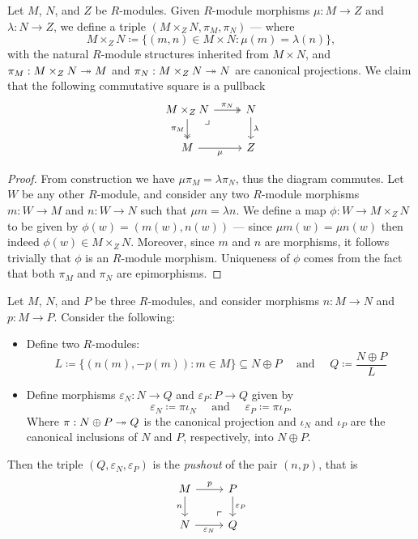 \begin{proposition}[Pullback]
\label{prop:pullback-modules}
Let \(M\), \(N\), and \(Z\) be \(R\)-modules. Given \(R\)-module morphisms
\(\mu: M \to Z\) and \(\lambda: N \to Z\), we define a triple
\((M \times_Z N, \pi_M, \pi_N)\) --- where
\[
M \times_Z N \coloneq \{(m, n) \in M \times N \colon \mu(m) = \lambda(n)\},
\]
with the natural \(R\)-module structures inherited from \(M \times N\), and
\(\pi_M: M \times_Z N \twoheadrightarrow M\) and \(\pi_N: M \times_Z N \twoheadrightarrow N\) are
canonical projections. We claim that the following commutative square is a
pullback
\[
\begin{tikzcd}
M \times_Z N \ar[d, two heads, "\pi_M"'] \ar[r, two heads, "\pi_N"]
\ar[dr, phantom, "\lrcorner", very near start]
&N \ar[d, "\lambda"] \\
M \ar[r, "\mu"'] &Z
\end{tikzcd}
\]
\end{proposition}

\begin{proof}
From construction we have \(\mu \pi_M = \lambda \pi_N\), thus the diagram
commutes. Let \(W\) be any other \(R\)-module, and consider any two \(R\)-module
morphisms \(m: W \to M\) and \(n: W \to N\) such that \(\mu m = \lambda n\). We
define a map \(\phi: W \to M \times_Z N\) to be given by
\(\phi(w) = (m(w), n(w))\) --- since \(\mu m(w) = \mu n(w)\) then indeed
\(\phi(w) \in M \times_Z N\). Moreover, since \(m\) and \(n\) are morphisms, it
follows trivially that \(\phi\) is an \(R\)-module morphism. Uniqueness of
\(\phi\) comes from the fact that both \(\pi_M\) and \(\pi_N\) are epimorphisms.
\end{proof}

\begin{proposition}[Pushout]
\label{prop:pushout-modules}
Let \(M\), \(N\), and \(P\) be three \(R\)-modules, and consider morphisms \(n:
M \to N\) and \(p: M \to P\). Consider the following:
\begin{itemize}\setlength\itemsep{0em}
\item Define two \(R\)-modules:
  \[
  L \coloneq \{(n(m), -p(m)) \colon m \in M\} \subseteq N \oplus P
  \quad\text{ and } \quad
  Q \coloneq \frac{N \oplus P}{L}
  \]
\item Define morphisms \(\varepsilon_N: N \to Q\) and \(\varepsilon_P: P \to Q\)
  given by
  \[
  \varepsilon_N \coloneq \pi \iota_N \quad\text{ and }\quad
  \varepsilon_P \coloneq \pi \iota_P.
  \]
  Where \(\pi: N \oplus P \twoheadrightarrow Q\) is the canonical projection and \(\iota_N\)
  and \(\iota_P\) are the canonical inclusions of \(N\) and \(P\), respectively,
  into \(N \oplus P\).
\end{itemize}
Then the triple \((Q, \varepsilon_N, \varepsilon_P)\) is the \emph{pushout} of
the pair \((n, p)\), that is
\[
\begin{tikzcd}
M \ar[r, "p"] \ar[d, "n"'] \ar[rd, very near end, phantom, "\ulcorner"]
&P \ar[d, "\varepsilon_P"] \\
N \ar[r, "\varepsilon_N"'] &Q
\end{tikzcd}
\]
\end{proposition}

